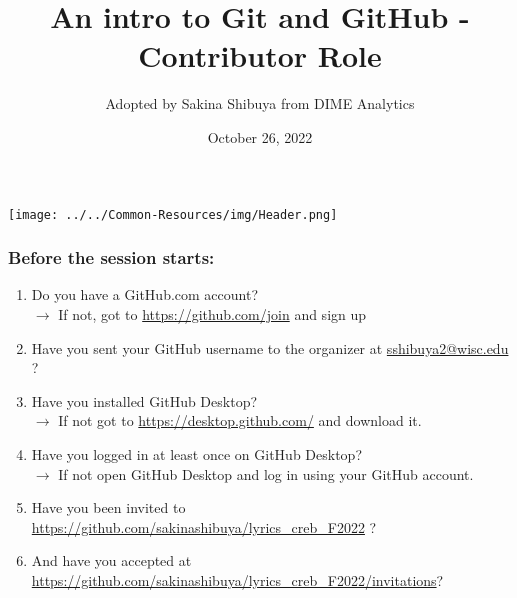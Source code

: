 \documentclass[aspectratio=169]{beamer} %
\title{An intro to Git and GitHub - Contributor Role}
\author{Adopted by Sakina Shibuya from DIME Analytics}
\institute{DIME - The World Bank - \trainingURL{https://www.worldbank.org/en/research/dime}}
\date{October 26, 2022}
\makeatletter
\newcommand{\trainingURL}[1]{{\color{blue}\url{#1}}}
\newcommand{\traininerUsername}{sakinashibuya}
\newcommand{\repoName}{\traininerUsername/lyrics_creb_F2022}
\newcommand{\trainingRepoURL}[1]{\trainingURL{https://github.com/\repoName #1}}
\newcommand{\trainerEmail}{\trainingURL{sshibuya2@wisc.edu} }
\makeatother
\begin{document}
\begin{frame}
\texttt{[image: ../../Common-Resources/img/Header.png]}
\vspace{-0.2cm}
\titlepage 	 %
\end{frame}

\begin{frame}
\frametitle{Before the session starts:}
	\begin{enumerate}
		\item Do you have a GitHub.com account? \\
		{\small $\rightarrow$ If not, got to \trainingURL{https://github.com/join} and sign up}
		\item Have you sent your GitHub username to the organizer at {\small \trainerEmail}?
		\item Have you installed GitHub Desktop? \\
		{\small $\rightarrow$ If not got to \trainingURL{https://desktop.github.com/} and download it.}
		\item Have you logged in at least once on GitHub Desktop? \\
		{\small $\rightarrow$ If not open GitHub Desktop and log in using your GitHub account.}
		\item Have you been invited to {\small \trainingRepoURL{}} ?
		\item And have you accepted at {\small \trainingRepoURL{/invitations}}?
	\end{enumerate}

\end{frame}
\end{document}

